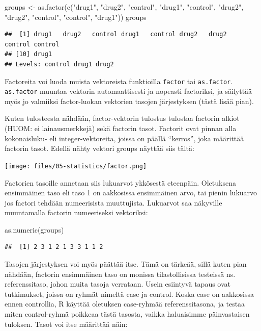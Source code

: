 \documentclass[
]{book}
\newenvironment{Shaded}{\begin{snugshade}}{\end{snugshade}}
\newcommand{\FunctionTok}[1]{\textcolor[rgb]{0.00,0.00,0.00}{#1}}
\newcommand{\NormalTok}[1]{#1}
\newcommand{\OtherTok}[1]{\textcolor[rgb]{0.56,0.35,0.01}{#1}}
\newcommand{\StringTok}[1]{\textcolor[rgb]{0.31,0.60,0.02}{#1}}
\begin{document}
\begin{Shaded}
\begin{Highlighting}[]
\NormalTok{groups }\OtherTok{\textless{}{-}} \FunctionTok{as.factor}\NormalTok{(}\FunctionTok{c}\NormalTok{(}\StringTok{"drug1"}\NormalTok{, }\StringTok{"drug2"}\NormalTok{, }\StringTok{"control"}\NormalTok{, }\StringTok{"drug1"}\NormalTok{, }\StringTok{"control"}\NormalTok{,}
                      \StringTok{"drug2"}\NormalTok{, }\StringTok{"drug2"}\NormalTok{, }\StringTok{"control"}\NormalTok{, }\StringTok{"control"}\NormalTok{, }\StringTok{"drug1"}\NormalTok{))}
\NormalTok{groups}
\end{Highlighting}
\end{Shaded}

\begin{verbatim}
##  [1] drug1   drug2   control drug1   control drug2   drug2   control control
## [10] drug1  
## Levels: control drug1 drug2
\end{verbatim}

Factoreita voi luoda muista vektoreista funktioilla \texttt{factor} tai \texttt{as.factor}. \texttt{as.factor} muuntaa vektorin automaattisesti ja nopeasti factoriksi, ja säilyttää myös jo valmiiksi factor-luokan vektorien tasojen järjestyksen (tästä lisää pian).

Kuten tulosteesta nähdään, factor-vektorin tulostus tulostaa factorin alkiot (HUOM: ei lainausmerkkejä) sekä factorin tasot. Factorit ovat pinnan alla kokonaisluku- eli integer-vektoreita, joissa on päällä ``kerros'', joka määrittää factorin tasot. Edellä nähty vektori groups näyttää siis tältä:

\texttt{[image: files/05-statistics/factor.png]}

Factorien tasoille annetaan siis lukuarvot ykkösestä eteenpäin. Oletuksena ensimmäinen taso eli taso 1 on aakkosissa ensimmäinen arvo, tai pienin lukuarvo jos factori tehdään numeerisista muuttujista. Lukuarvot saa näkyville muuntamalla factorin numeeriseksi vektoriksi:

\begin{Shaded}
\begin{Highlighting}[]
\FunctionTok{as.numeric}\NormalTok{(groups)}
\end{Highlighting}
\end{Shaded}

\begin{verbatim}
##  [1] 2 3 1 2 1 3 3 1 1 2
\end{verbatim}

Tasojen järjestyksen voi myös päättää itse. Tämä on tärkeää, sillä kuten pian nähdään, factorin ensimmäinen taso on monissa tilastollisissa testeissä ns. referenssitaso, johon muita tasoja verrataan. Usein esiintyvä tapaus ovat tutkimukset, joissa on ryhmät nimeltä case ja control. Koska case on aakkosissa ennen controllia, R käyttää oletuksen case-ryhmää referenssitasona, ja testaa miten control-ryhmä poikkeaa tästä tasosta, vaikka haluaisimme päinvastaisen tuloksen. Tasot voi itse määrittää näin:
\end{document}
